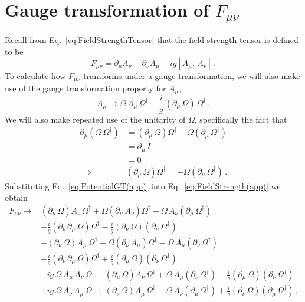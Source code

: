 \begin{align*}
\end{align*}

\section{Gauge transformation of $F_{\mu\nu}$}\label{app:GTF}
Recall from Eq.~\ref{eq:FieldStrengthTensor} that the field strength tensor is defined to be
%
\begin{equation}
F_{\mu\nu}=\partial_\mu A_\nu - \partial_\nu A_\mu - ig[A_\mu,\,A_\nu]\, .
\label{eq:FieldStrength(app)}
\end{equation}
%
To calculate how $F_{\mu\nu}$ transforms under a gauge transformation, we will also make use of the gauge transformation property for $A_\mu$,
%
\begin{equation}
A_\mu \rightarrow \Omega\,A_\mu\,\Omega^\dag - \frac{i}{g}\,(\partial_\mu\,\Omega)\,\Omega^\dag\, . 
\label{eq:PotentialGT(app)}
\end{equation}
%
We will also make repeated use of the unitarity of $\Omega$, specifically the fact that
%
\begin{align*}
\partial_\mu \left(\Omega\, \Omega^\dagger\right) &= \left(\partial_\mu\,\Omega\right)\Omega^\dagger + \Omega\left(\partial_\mu\, \Omega^\dagger\right)\\
&=\partial_\mu \, I\\
&= 0\\
\implies & \left(\partial_\mu\,\Omega\right)\Omega^\dagger = -\Omega\left(\partial_\mu\, \Omega^\dagger\right)\, .
\end{align*}
%
Substituting Eq.~\ref{eq:PotentialGT(app)} into Eq.~\ref{eq:FieldStrength(app)} we obtain
%
\begin{align*}
F_{\mu\nu} \rightarrow &\left(\partial_\mu \, \Omega\right)A_\nu \, \Omega^\dagger + \Omega\left(\partial_\mu\,A_\nu\right)\Omega^\dagger + \Omega \, A_\nu\left(\partial_\mu \, \Omega^\dagger\right)\\
& - \frac{i}{g}\left(\partial_\nu\,\partial_\mu\, \Omega\right)\Omega^\dagger - \frac{i}{g}\left(\partial_\nu\,\Omega\right)\left(\partial_\mu\,\Omega^\dagger\right)\\
& - \left(\partial_\nu \, \Omega\right)A_\mu \, \Omega^\dagger - \Omega\left(\partial_\nu\,A_\mu\right)\Omega^\dagger - \Omega \, A_\mu\left(\partial_\nu \, \Omega^\dagger\right)\\
& + \frac{i}{g}\left(\partial_\nu\,\partial_\mu\, \Omega\right)\Omega^\dagger + \frac{i}{g}\left(\partial_\mu\,\Omega\right)\left(\partial_\nu\,\Omega^\dagger\right)\\
& -ig \, \Omega \, A_\mu \, A_\nu \, \Omega^\dagger - \left(\partial_\mu \, \Omega\right)A_\nu \, \Omega^\dagger + \Omega\,A_\mu\left(\partial_\nu \, \Omega^\dagger\right) - \frac{i}{g}\left(\partial_\mu\,\Omega\right)\left(\partial_\nu\,\Omega^\dagger\right)\\
& +ig \, \Omega \, A_\nu \, A_\mu \, \Omega^\dagger + \left(\partial_\nu \, \Omega\right)A_\mu \, \Omega^\dagger - \Omega\,A_\nu\left(\partial_\mu \, \Omega^\dagger\right) + \frac{i}{g}\left(\partial_\nu\,\Omega\right)\left(\partial_\mu\,\Omega^\dagger\right)\, . 
\end{align*}
